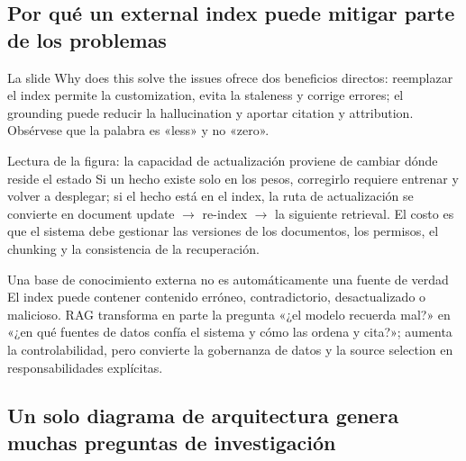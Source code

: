\subsection{Por qué un external index puede mitigar parte de los problemas}

La slide Why does this solve the issues ofrece dos beneficios directos: reemplazar el index permite la customization, evita la staleness y corrige errores; el grounding puede reducir la hallucination y aportar citation y attribution. Obsérvese que la palabra es «less» y no «zero».


\begin{knowledgebox}{Lectura de la figura: la capacidad de actualización proviene de cambiar dónde reside el estado}
Si un hecho existe solo en los pesos, corregirlo requiere entrenar y volver a desplegar; si el hecho está en el index, la ruta de actualización se convierte en document update $\rightarrow$ re-index $\rightarrow$ la siguiente retrieval. El costo es que el sistema debe gestionar las versiones de los documentos, los permisos, el chunking y la consistencia de la recuperación.
\end{knowledgebox}

\begin{warningbox}{Una base de conocimiento externa no es automáticamente una fuente de verdad}
El index puede contener contenido erróneo, contradictorio, desactualizado o malicioso. RAG transforma en parte la pregunta «¿el modelo recuerda mal?» en «¿en qué fuentes de datos confía el sistema y cómo las ordena y cita?»; aumenta la controlabilidad, pero convierte la gobernanza de datos y la source selection en responsabilidades explícitas.
\end{warningbox}


\subsection{Un solo diagrama de arquitectura genera muchas preguntas de investigación}

